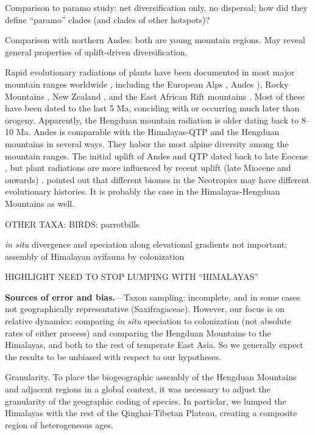 Comparison to paramo study: net diversification only, no dispersal; how did they define ``paramo'' clades (and clades of other hotspots)?

Comparison with northern Andes: both are young mountain regions. May reveal general properties of uplift-driven diversification.

Rapid evolutionary radiations of plants have been documented in most major mountain ranges worldwide \citep[reviewed in][]{Hughes2015}, including the European Alps \citep{Roquet2013}, Andes \citep[e.g.][]{Hughes2006,Luebert2014}), Rocky Mountains \citep{DrummondC2012}, New Zealand \citep{Joly2014}, and the East African Rift mountains \citep{Linder2014}. Most of these have been dated to the last 5 Ma, conciding with or occurring much later than orogeny. Apparently, the Hengduan mountain radiation is older dating back to 8--10 Ma. Andes is comparable with the Himalayas-QTP and the Hengduan mountains in several ways. They habor the most alpine diversity among the mountain ranges. The initial uplift of Andes and QTP dated back to late Eocene \citep{Gregory-Wodzicki2000,Graham2009}, but plant radiations are more influenced by recent uplift (late Miocene and onwards) \citep{Hughes2013,Luebert2014,Hughes2015,Madrinan2013}. \citet{Hughes2013} pointed out that different biomes in the Neotropics may have different evolutionary histories. It is probably the case in the Himalayas-Hengduan Mountains as well. 

OTHER TAXA: BIRDS: parrotbills \citep{liu2016}

\textit{in situ} divergence and speciation along elevational gradients not important; assembly of Himalayan avifauna by colonization \citep{johansson2007}

HIGHLIGHT NEED TO STOP LUMPING WITH ``HIMALAYAS''

\textbf{Sources of error and bias.}---Taxon sampling: incomplete, and in some cases not geographically representative (Saxifragaceae). However, our focus is on relative dynamics: comparing \textit{in situ} speciation to colonization (not absolute rates of either process) and comparing the Hengduan Mountains to the Himalayas, and both to the rest of temperate East Asia. So we generally expect the results to be unbiased with respect to our hypotheses.

Granularity. To place the biogeographic assembly of the Hengduan Mountains and adjacent regions in a global context, it was necessary to adjust the granularity of the geographic coding of species. In particlar, we lumped the Himalayas with the rest of the Qinghai-Tibetan Plateau, creating a composite region of heterogeneous ages.



